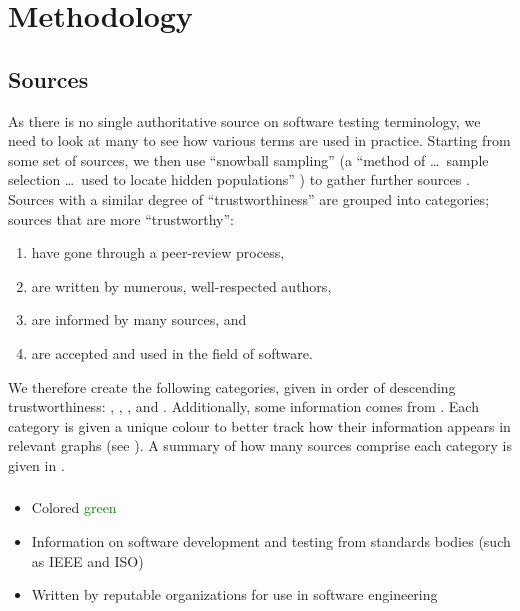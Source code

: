 \section{Methodology}
\label{methodology}

\subsection{Sources}
\label{sources}
As there is no single authoritative source on software testing terminology,
we need to look at many to see how various terms are used in practice.
Starting from some set of sources, we then use
``snowball sampling'' (a ``method of \dots\ sample selection \dots\ used to
locate hidden populations'' \citep{Johnson2014}) to gather further sources%
. Sources with a similar degree of
``trustworthiness'' are grouped into categories; sources that are more
``trustworthy'':
\begin{enumerate}
    \item have gone through a peer-review process,
    \item are written by numerous, well-respected authors,
    \item are informed by many sources, and
    \item are accepted and used in the field of software.
\end{enumerate}

We therefore create the following categories, given in order of descending
trustworthiness: \stds{}, \metas{}, \texts{}, and \papers{}. \ifnotpaper
    Additionally, some information comes from . \fi Each category is
given a unique colour to better track how their information appears in relevant
graphs (see ). A summary
of how many sources comprise each category is given in .

\subsubsection{}
\label{stds}
\begin{itemize}
    \item Colored \textcolor{green}{green}
    \item Information on software development and testing from
          standards bodies \ifnotpaper\else (such as IEEE and ISO)\fi
    \item Written by reputable organizations for use in software engineering
\end{itemize}

